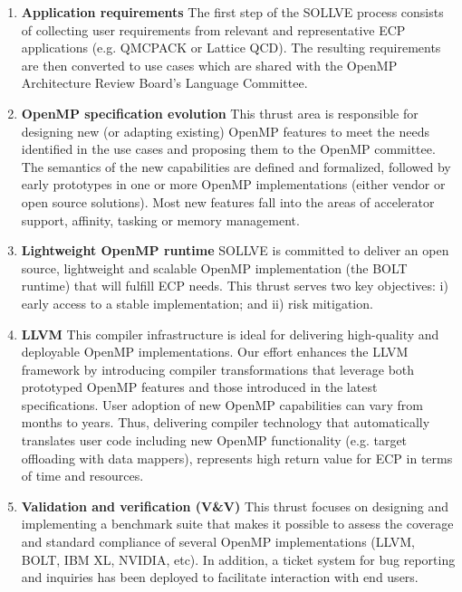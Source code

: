 \begin{enumerate}
\item {\bf Application requirements}
The first step of the SOLLVE process consists of collecting user requirements
from relevant and representative ECP applications (e.g. QMCPACK or Lattice QCD).
The resulting requirements are then converted to use cases which are shared with
 the OpenMP Architecture Review Board's Language Committee.
\item {\bf OpenMP specification evolution}
This thrust area is responsible for designing new (or adapting existing) OpenMP features to 
meet the needs identified in the use cases and proposing them to the OpenMP committee. 
  The semantics
of the new capabilities are defined and formalized, followed by early
prototypes in one or more OpenMP implementations (either vendor or open
source solutions).  %
Most new features fall into the areas
of accelerator support, affinity, tasking or memory management.
\item {\bf Lightweight OpenMP runtime}
SOLLVE is committed to deliver an open source, lightweight and scalable
OpenMP implementation (the BOLT runtime) that will fulfill ECP needs.
This thrust serves two key objectives: i) early access to a stable 
implementation; and ii) risk mitigation.
\item {\bf LLVM }
This compiler infrastructure is ideal for 
delivering high-quality and deployable OpenMP implementations.
Our effort enhances the LLVM framework by introducing compiler transformations
that leverage both prototyped OpenMP features and those introduced
in the latest specifications.  %
User adoption of new OpenMP capabilities can vary from
months to years. Thus, delivering compiler technology that automatically translates 
user code including new OpenMP functionality (e.g. target offloading with
data mappers), represents high return value for ECP in terms of time and
resources. 
\item {\bf Validation and verification (V\&V)} This thrust focuses on
designing and implementing a benchmark suite that makes it possible to assess the coverage
and standard compliance of several OpenMP implementations (LLVM, BOLT, IBM XL,
NVIDIA, etc). In addition, a ticket system for bug reporting and inquiries has
 been deployed to facilitate interaction with end users.
\end{enumerate}

